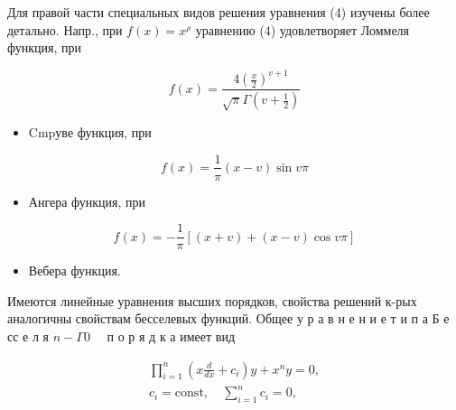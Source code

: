 \documentclass[10pt]{article}
\begin{document}
Для правой части специальных видов решения уравнения (4) изучены более детально. Напр., при $f(x)=x^{\rho}$ уравнению (4) удовлетворяет Ломмеля функция, при



\[

f(x)=\frac{4\left(\frac{x}{2}\right)^{v+1}}{\sqrt{\pi} \Gamma\left(v+\frac{1}{2}\right)}

\]



\begin{itemize}

  \item Cmpуве функция, при

\end{itemize}



\[

f(x)=\frac{1}{\pi}(x-v) \sin v \pi

\]



\begin{itemize}

  \item Ангера функция, при

\end{itemize}



\[

f(x)=-\frac{1}{\pi}[(x+v)+(x-v) \cos v \pi]

\]



\begin{itemize}

  \item Вебера функция.

\end{itemize}



Имеются линейные уравнения высших порядков, свойства решений к-рых аналогичны свойствам бесселевых функций. Общее у р а в н е н и е т и п а Б е сс е л я $n-\Gamma 0 \quad$ п о р я д к а имеет вид



\[

\begin{gathered}

\prod_{i=1}^{n}\left(x \frac{d}{d x}+c_{i}\right) y+x^{n} y=0, \\

c_{i}=\mathrm{const}, \quad \sum_{i=1}^{n} c_{i}=0,

\end{gathered}

\]
\end{document}
